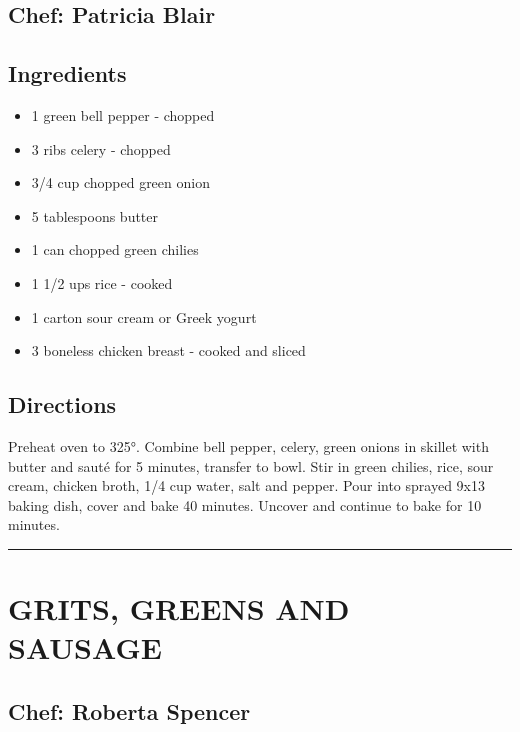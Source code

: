 \documentclass[
]{book}
\providecommand{\tightlist}{%
  \setlength{\itemsep}{0pt}\setlength{\parskip}{0pt}}
\begin{document}
\hypertarget{chef-patricia-blair-12}{%
\subsection*{Chef: Patricia Blair}\label{chef-patricia-blair-12}}


\hypertarget{ingredients-57}{%
\subsection*{Ingredients}\label{ingredients-57}}


\begin{itemize}
\tightlist
\item
  1 green bell pepper - chopped
\item
  3 ribs celery - chopped
\item
  3/4 cup chopped green onion
\item
  5 tablespoons butter
\item
  1 can chopped green chilies
\item
  1 1/2 ups rice - cooked
\item
  1 carton sour cream or Greek yogurt
\item
  3 boneless chicken breast - cooked and sliced
\end{itemize}

\hypertarget{directions-57}{%
\subsection*{Directions}\label{directions-57}}


Preheat oven to 325°. Combine bell pepper, celery, green onions in skillet with butter and
sauté for 5 minutes, transfer to bowl. Stir in green chilies, rice, sour cream, chicken broth,
1/4 cup water, salt and pepper. Pour into sprayed 9x13 baking dish, cover and bake 40 minutes.
Uncover and continue to bake for 10 minutes.

\begin{center}\rule{0.5\linewidth}{0.5pt}\end{center}

\hypertarget{grits-greens-and-sausage}{%
\section*{GRITS, GREENS AND SAUSAGE}\label{grits-greens-and-sausage}}


\hypertarget{chef-roberta-spencer-19}{%
\subsection*{Chef: Roberta Spencer}\label{chef-roberta-spencer-19}}
\end{document}
